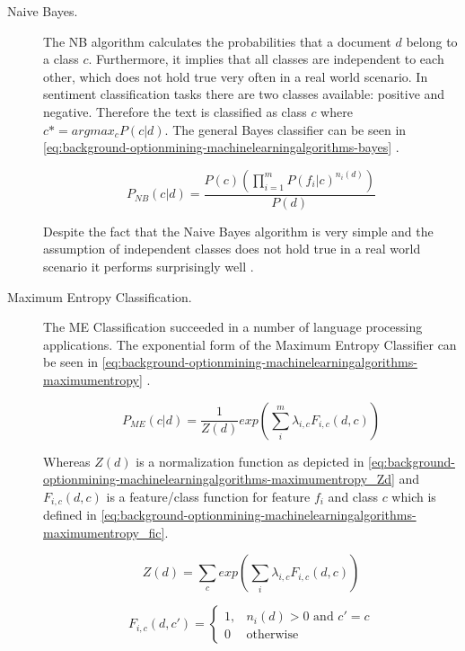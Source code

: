\begin{description}
	\item[Naive Bayes.] 
    The \ac{NB} algorithm calculates the probabilities that a document $d$ belong to a class $c$.
	Furthermore, it implies that all classes are independent to each other, which does not hold true very often in a real world scenario.
	In sentiment classification tasks there are two classes available: positive and negative.
	Therefore the text is classified as class $c$ where $c* = arg max_c P(c | d)$.
	The general Bayes classifier can be seen in \autoref{eq:background-optionmining-machinelearningalgorithms-bayes} \cite{Pang2002}.
	
	\begin{equation}
		P_{NB}(c|d) = \frac{P(c) (\prod_{i=1}^{m} P(f_i|c)^{n_i(d)}) }{P(d)}
		\label{eq:background-optionmining-machinelearningalgorithms-bayes}
	\end{equation}
	
	Despite the fact that the Naive Bayes algorithm is very simple and the assumption of independent classes does not hold true in a real world scenario it performs surprisingly well \cite{Pang2002}.
	
	\item[Maximum Entropy Classification.]
	The \ac{ME} Classification succeeded in a number of language processing applications.
	The exponential form of the Maximum Entropy Classifier can be seen in \autoref{eq:background-optionmining-machinelearningalgorithms-maximumentropy} \cite{Pang2002}.
	
	\begin{equation}
		P_{ME}(c|d) = \frac{1}{Z(d)} exp \left( \sum_i^m \lambda_{i,c}F_{i,c}(d,c) \right)
		\label{eq:background-optionmining-machinelearningalgorithms-maximumentropy}
	\end{equation}
	
	Whereas $Z(d)$ is a normalization function as depicted in \autoref{eq:background-optionmining-machinelearningalgorithms-maximumentropy_Zd} \cite{Nigam1999} and $F_{i,c}(d,c)$ is a feature/class function for feature $f_i$ and class $c$ which is defined in \autoref{eq:background-optionmining-machinelearningalgorithms-maximumentropy_fic}.

	\begin{equation}
		Z(d) = \sum_c exp(\sum_i \lambda_{i,c} F_{i,c}(d,c))
		\label{eq:background-optionmining-machinelearningalgorithms-maximumentropy_Zd}
	\end{equation}

	\begin{equation}
	F_{i,c}(d,c') = 
		\begin{cases}
		1, & n_i(d) > 0 \text{ and } c' = c \\
		0  & \text{otherwise}
		\end{cases}
		\label{eq:background-optionmining-machinelearningalgorithms-maximumentropy_fic}
	\end{equation}


\end{description}
